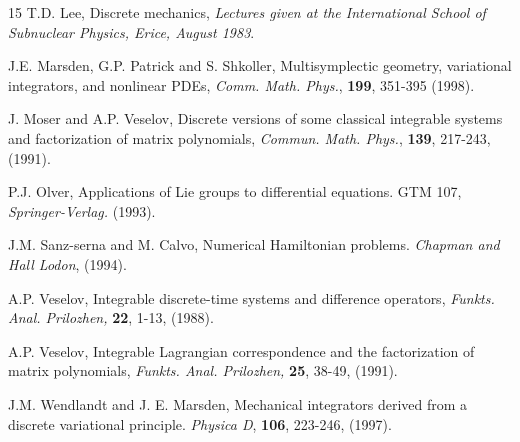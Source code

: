 \documentclass[a4paper,a4paper]{article}
\begin{document}
\begin{thebibliography} {15}
\label{l3}
T.D. Lee, Discrete mechanics, {\em Lectures given at the International School
of Subnuclear Physics, Erice, August 1983}.

\label{m1}
J.E. Marsden, G.P. Patrick and S. Shkoller, Multisymplectic geometry,
variational integrators, and nonlinear PDEs, {\em Comm. Math. Phys.},
{\bf 199}, 351-395 (1998).


\label{m3}
J. Moser and A.P. Veselov, Discrete versions of some classical integrable systems
and factorization of matrix polynomials, {\em Commun. Math. Phys.}, {\bf 139},
217-243, (1991).

\label{o1}
 P.J. Olver, Applications of Lie groups to differential equations.
GTM 107, {\em Springer-Verlag.} (1993).

\label{s1}
J.M. Sanz-serna and M. Calvo, Numerical Hamiltonian problems. {\em
Chapman and Hall Lodon}, (1994).

\label{v1}
A.P. Veselov, Integrable discrete-time systems and difference operators, {\em
Funkts. Anal. Prilozhen,} {\bf 22}, 1-13, (1988).

\label{v2}
A.P. Veselov, Integrable Lagrangian correspondence and the factorization of
matrix polynomials,  {\em Funkts. Anal. Prilozhen,} {\bf 25}, 38-49, (1991).

\label{w1}
J.M. Wendlandt and J. E. Marsden, Mechanical integrators derived from a discrete
variational principle. {\em Physica D}, {\bf 106}, 223-246, (1997).



\end{thebibliography}

\end{document}
